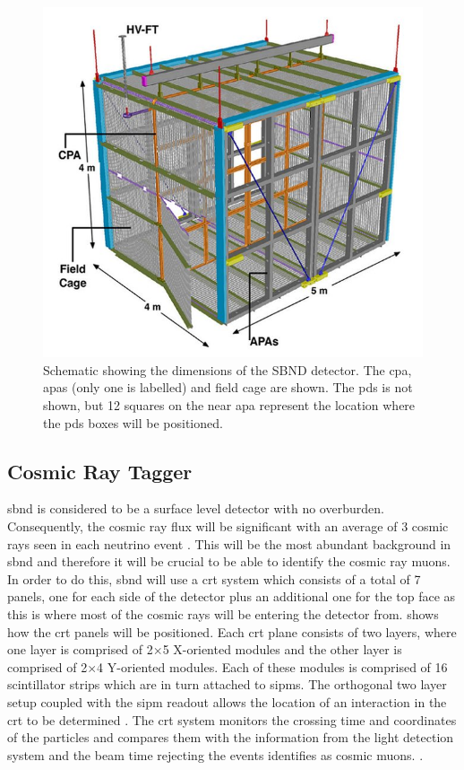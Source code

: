 \begin{figure}[!h]
    \centering
    \includegraphics[width = \largefigwidth]{figures-chap3/SBND.jpg}
    \caption[Schematic of the SBN detector.]{Schematic showing the dimensions of the SBND detector. The \gls{cpa}, \glspl{apa} (only one is labelled) and field cage are shown. The \gls{pds} is not shown, but 12 squares on the near \gls{apa} represent the location where the \gls{pds} boxes will be positioned. \cite{LArTPC_review}}
    \label{fig:sbnd_schematic}
\end{figure}

\subsection*{Cosmic Ray Tagger}

\gls{sbnd} is considered to be a surface level detector with no overburden. Consequently, the cosmic ray flux will be significant with an average of 3 cosmic rays seen in each neutrino event \cite{SBN_Proposal}. This will be the most abundant background in \gls{sbnd} and therefore it will be crucial to be able to identify the cosmic ray muons. In order to do this, \gls{sbnd} will use a \gls{crt} system which consists of a total of 7 panels, one for each side of the detector plus an additional one for the top face as this is where most of the cosmic rays will be entering the detector from.  shows how the \gls{crt} panels will be positioned. Each \gls{crt} plane consists of two layers, where one layer is comprised of 2$\times$5 X-oriented modules and the other layer is comprised of 2$\times$4 Y-oriented modules. Each of these modules is comprised of 16 scintillator strips which are in turn attached to \glspl{sipm}. The orthogonal two layer setup coupled with the \gls{sipm} readout allows the location of an interaction in the \gls{crt} to be determined \cite{sbnd_crt}. The \gls{crt} system monitors the crossing time and coordinates of the particles and compares them with the information from the light detection system and the beam time rejecting the events identifies as cosmic muons. \cite{microboone_crt}.

